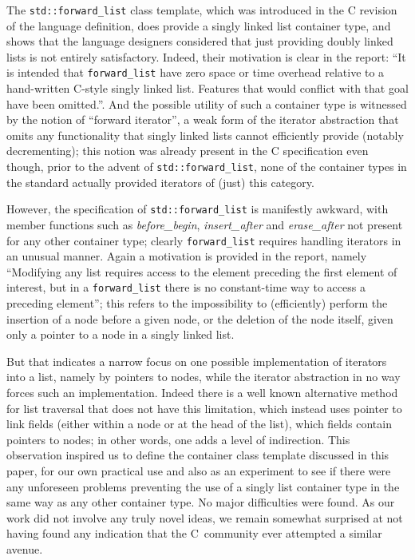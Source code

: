 \documentclass[12pt]{article}
\theoremstyle{plain}
\theoremstyle{definition}
\def\PP{\copy\PPbox}
\newcommand\Cee{\textsc{C}}
\newcommand\Cpp{\Cee\PP}
\newcommand\std[1]{\texttt{std::#1}}
\def\frwl.{\std{forward\_list}}
\def\insa.{\textit{insert\_\!after}}
\def\ersa.{\textit{erase\_\!after}}
\begin{document}
The \frwl. class template, which was introduced in the \Cpp11 revision of the
language definition, does provide a singly linked list container type, and shows
that the language designers considered that just providing doubly linked lists
is not entirely satisfactory. Indeed, their motivation is clear in the report:
``It is intended that \texttt{forward\_list} have zero space or time overhead
relative to a hand-written C-style singly linked list. Features that would
conflict with that goal have been omitted.''. And the possible utility of such a
container type is witnessed by the notion of ``forward iterator'', a weak form
of the iterator abstraction that omits any functionality that singly linked
lists cannot efficiently provide (notably decrementing); this notion was already
present in the \Cpp03 specification even though, prior to the advent of \frwl.,
none of the container types in the standard actually provided iterators of
(just) this category.

However, the specification of \frwl. is manifestly awkward, with member
functions such as \textit{before\_begin}, \insa. and \ersa. not present for any
other container type; clearly \texttt{forward\_list} requires handling iterators
in an unusual manner. Again a motivation is provided in the report, namely
``Modifying any list requires access to the element preceding the first element
of interest, but in a \texttt{forward\_list} there is no constant-time way to
access a preceding element''; this refers to the impossibility to (efficiently)
perform the insertion of a node before a given node, or the deletion of the node
itself, given only a pointer to a node in a singly linked list.

But that indicates a narrow focus on one possible implementation of iterators
into a list, namely by pointers to nodes, while the iterator abstraction in no
way forces such an implementation. Indeed there is a well known alternative
method for list traversal that does not have this limitation, which instead uses
pointer to link fields (either within a node or at the head of the list), which
fields contain pointers to nodes; in other words, one adds a level of
indirection. This observation inspired us to define the container class template
discussed in this paper, for our own practical use and also as an experiment to
see if there were any unforeseen problems preventing the use of a singly list
container type in the same way as any other container type. No major
difficulties were found. As our work did not involve any truly novel ideas, we
remain somewhat surprised at not having found any indication that the
\Cpp\ community ever attempted a similar avenue.
\end{document}
